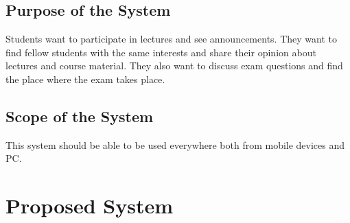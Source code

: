 \documentclass[a4paper,12pt,halfparskip]{scrartcl}
\newenvironment{subs}
{\adjustwidth{3em}{0pt}}
{\endadjustwidth}
\begin{document}
    \begin{subs}
        \subsection{Purpose of the System}
        Students want to participate in lectures and see announcements.
        They want to find fellow students with the same interests and share their opinion about lectures and course material.
        They also want to discuss exam questions and find the place where the exam takes place.

        \subsection{Scope of the System}
        This system should be able to be used everywhere both from mobile devices and PC.
    \end{subs}


    \section{Proposed System}
\end{document}
